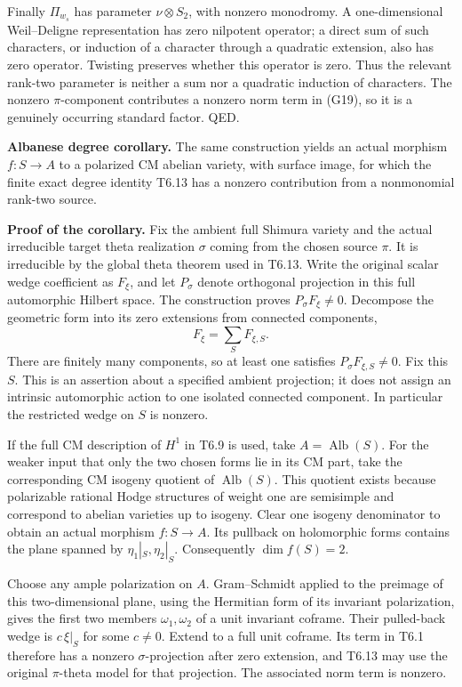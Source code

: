 Finally \(\Pi_{w_s}\) has parameter \(\nu\otimes S_2\), with nonzero monodromy. A one-dimensional Weil--Deligne representation has zero nilpotent operator; a direct sum of such characters, or induction of a character through a quadratic extension, also has zero operator. Twisting preserves whether this operator is zero. Thus the relevant rank-two parameter is neither a sum nor a quadratic induction of characters. The nonzero \(\pi\)-component contributes a nonzero norm term in (G19), so it is a genuinely occurring standard factor. QED.

\textbf{Albanese degree corollary.} The same construction yields an actual morphism \(f:S\to A\) to a polarized CM abelian variety, with surface image, for which the finite exact degree identity T6.13 has a nonzero contribution from a nonmonomial rank-two source.

\textbf{Proof of the corollary.} Fix the ambient full Shimura variety and the actual irreducible target theta realization \(\sigma\) coming from the chosen source \(\pi\). It is irreducible by the global theta theorem used in T6.13. Write the original scalar wedge coefficient as \(F_\xi\), and let \(P_\sigma\) denote orthogonal projection in this full automorphic Hilbert space. The construction proves \(P_\sigma F_\xi\ne0\). Decompose the geometric form into its zero extensions from connected components, \[
F_\xi=\sum_S F_{\xi,S}.
\] There are finitely many components, so at least one satisfies \(P_\sigma F_{\xi,S}\ne0\). Fix this \(S\). This is an assertion about a specified ambient projection; it does not assign an intrinsic automorphic action to one isolated connected component. In particular the restricted wedge on \(S\) is nonzero.

If the full CM description of \(H^1\) in T6.9 is used, take \(A=\operatorname{Alb}(S)\). For the weaker input that only the two chosen forms lie in its CM part, take the corresponding CM isogeny quotient of \(\operatorname{Alb}(S)\). This quotient exists because polarizable rational Hodge structures of weight one are semisimple and correspond to abelian varieties up to isogeny. Clear one isogeny denominator to obtain an actual morphism \(f:S\to A\). Its pullback on holomorphic forms contains the plane spanned by \(\eta_1|_S,\eta_2|_S\). Consequently \(\dim f(S)=2\).

Choose any ample polarization on \(A\). Gram--Schmidt applied to the preimage of this two-dimensional plane, using the Hermitian form of its invariant polarization, gives the first two members \(\omega_1,\omega_2\) of a unit invariant coframe. Their pulled-back wedge is \(c\,\xi|_S\) for some \(c\ne0\). Extend to a full unit coframe. Its term in T6.1 therefore has a nonzero \(\sigma\)-projection after zero extension, and T6.13 may use the original \(\pi\)-theta model for that projection. The associated norm term is nonzero.

